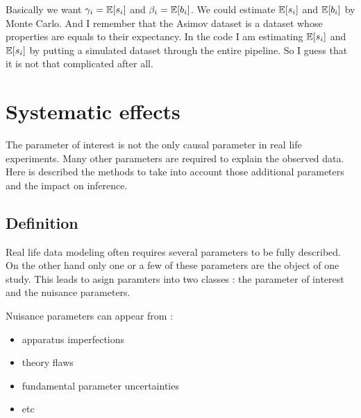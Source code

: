 
Basically we want $\gamma_i = \mathbb{E} [s_i]$ and $\beta_i = \mathbb{E} [b_i]$.
We could estimate $\mathbb{E} [s_i]$ and $\mathbb{E} [b_i]$ by Monte Carlo.
And I remember that the Asimov dataset is a dataset whose properties are equals to their expectancy.
In the code I am estimating $\mathbb{E} [s_i]$ and $\mathbb{E} [s_i]$ by putting a simulated dataset through the entire pipeline.
So I guess that it is not that complicated after all.








\section{Systematic effects} %
\label{sec:systematic_effects}


The parameter of interest is not the only causal parameter in real life experiments.
Many other parameters are required to explain the observed data.
Here is described the methods to take into account those additional parameters and the impact on inference. 





\subsection{Definition} %
\label{sub:definition}

Real life data modeling often requires several parameters to be fully described.
On the other hand only one or a few of these parameters are the object of one study.
This leads to asign paramters into two classes : the parameter of interest and the nuisance parameters.

Nuisance parameters can appear from :
\begin{itemize}
	\item apparatus imperfections
	\item theory flaws
	\item fundamental parameter uncertainties
	\item etc
\end{itemize}

